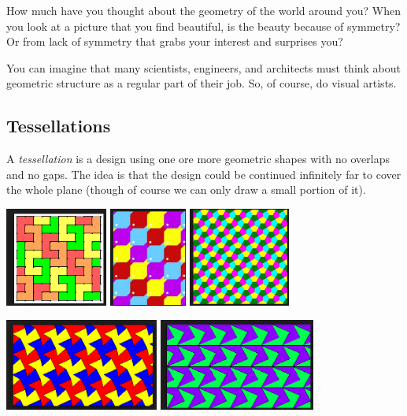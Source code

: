 \documentclass[12pt, reqno]{amsart}
\theoremstyle{remark}
\theoremstyle{definition}
\numberwithin{equation}{section}  %
\begin{document}
How much have you thought about the geometry of the world around you?  When you look at a picture that you find beautiful, is the beauty because of symmetry?  Or from lack of symmetry that grabs your interest and surprises you?

You can imagine that many scientists, engineers, and architects must think about geometric structure as a regular part of their job.  So, of course, do visual artists.   


\subsection{Tessellations}
A \emph{tessellation} is a design using one ore more geometric shapes with no overlaps and no gaps.  The idea is that the design could be continued infinitely far to cover the whole plane (though of course we can only draw a small portion of it).  

\begin{center}\label{pic:tessagain}
\includegraphics[height=3.25cm]{tessellate2}
\qquad
\includegraphics[height=3.25cm]{tessellate5}
\qquad
\includegraphics[height=3.25cm]{tessellate6}

\bigskip

\includegraphics[height=3cm]{tessellate3}
\qquad\qquad
\includegraphics[height=3cm]{tessellate7}

\end{center}
\end{document}
